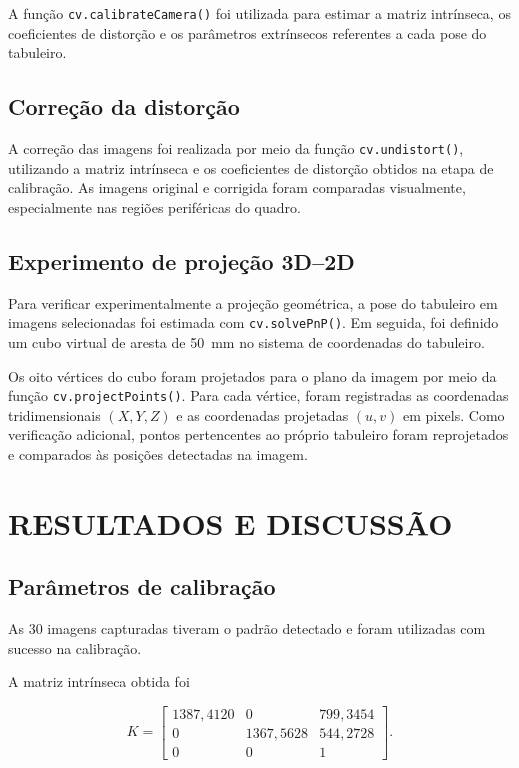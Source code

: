 \documentclass[12pt, a4paper, twoside, chapter=TITLE, subsection=TITLE, section=TITLE, subsubsection=TITLE, subsubsubsection=TITLE, english, german, brazil]{abntex2}
\begin{document}
A função \texttt{cv.calibrateCamera()} foi utilizada para estimar a matriz intrínseca, os coeficientes de distorção e os parâmetros extrínsecos referentes a cada pose do tabuleiro.

\section{Correção da distorção}
A correção das imagens foi realizada por meio da função \texttt{cv.undistort()}, utilizando a matriz intrínseca e os coeficientes de distorção obtidos na etapa de calibração. As imagens original e corrigida foram comparadas visualmente, especialmente nas regiões periféricas do quadro.

\section{Experimento de projeção 3D--2D}
Para verificar experimentalmente a projeção geométrica, a pose do tabuleiro em imagens selecionadas foi estimada com \texttt{cv.solvePnP()}. Em seguida, foi definido um cubo virtual de aresta de \SI{50}{\milli\metre} no sistema de coordenadas do tabuleiro.

Os oito vértices do cubo foram projetados para o plano da imagem por meio da função \texttt{cv.projectPoints()}. Para cada vértice, foram registradas as coordenadas tridimensionais $(X,Y,Z)$ e as coordenadas projetadas $(u,v)$ em pixels. Como verificação adicional, pontos pertencentes ao próprio tabuleiro foram reprojetados e comparados às posições detectadas na imagem.

\chapter{RESULTADOS E DISCUSSÃO}
\section{Parâmetros de calibração}
As 30 imagens capturadas tiveram o padrão detectado e foram utilizadas com sucesso na calibração.

A matriz intrínseca obtida foi

\begin{equation}
K =
\begin{bmatrix}
1387{,}4120 & 0 & 799{,}3454 \\
0 & 1367{,}5628 & 544{,}2728 \\
0 & 0 & 1
\end{bmatrix}.
\end{equation}
\end{document}
